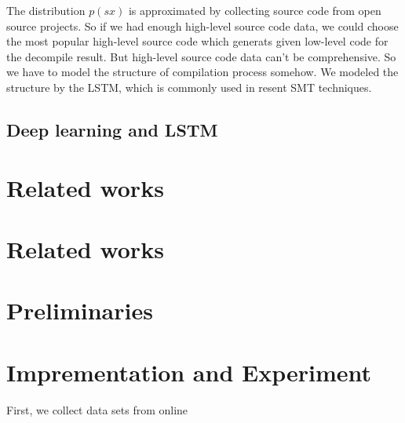 \documentclass[senior,final,11pt]{iscs-thesis}
\begin{document}
The distribution $p(sx)$ is approximated by collecting source code from open source projects.
So if we had enough high-level source code data, we could choose the most popular high-level source code which generats given low-level code for the decompile result.
But high-level source code data can't be comprehensive.
So we have to model the structure of compilation process somehow.
We modeled the structure by the LSTM, which is commonly used in resent SMT techniques.



\section{Deep learning and LSTM}


\chapter{Related works}



\chapter{Related works}


\chapter{Preliminaries}


\chapter{Imprementation and Experiment}
First, we collect data sets from online 
\end{document}
